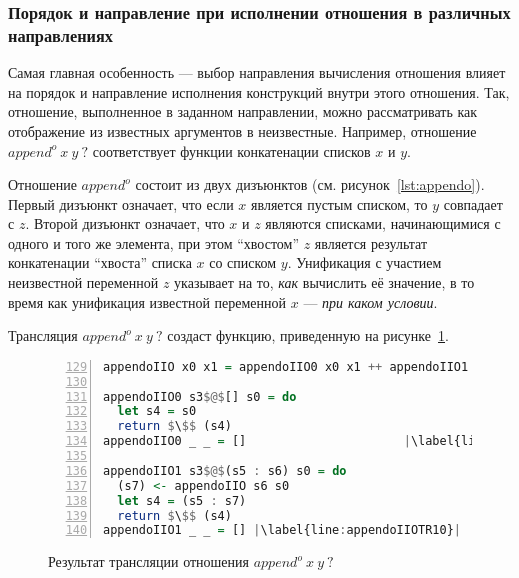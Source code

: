 
\subsubsection{Порядок и направление при исполнении отношения в различных направлениях}

Самая главная особенность --- выбор направления вычисления отношения влияет на порядок и направление исполнения конструкций внутри этого отношения.
Так, отношение, выполненное в заданном направлении, можно рассматривать как отображение из известных аргументов в неизвестные. 
Например, отношение $append^o \ x \ y \ ?$ соответствует функции конкатенации списков $x$ и $y$.

Отношение $append^o$ состоит из двух дизъюнктов (см. рисунок~\ref{lst:appendo}). 
Первый дизъюнкт означает, что если $x$ является пустым списком, то $y$ совпадает с $z$. 
Второй дизъюнкт означает, что $x$ и $z$ являются списками, начинающимися с одного и того же элемента, при этом ``хвостом'' $z$ является результат конкатенации ``хвоста'' списка $x$ со списком $y$. 
Унификация с участием неизвестной переменной $z$ указывает на то, \emph{как} вычислить её значение, в то время как унификация известной переменной $x$ --- \emph{при каком условии}.

Трансляция $append^o \ x \ y \ ?$ создаст функцию, приведенную на рисунке~\ref{lst:appendoIIOTR}.

\begin{figure}[h!]
  \begin{center}
  \begin{minipage}{0.75\textwidth}
  \begin{lstlisting}[language=Haskell, frame=single, numbers=left,numberstyle=\small, firstnumber=129, escapechar=|]
appendoIIO x0 x1 = appendoIIO0 x0 x1 ++ appendoIIO1 x0 x1

appendoIIO0 s3$@$[] s0 = do                                  |\label{line:appendoIIOTR2}|
  let s4 = s0
  return $\$$ (s4)
appendoIIO0 _ _ = []                      |\label{line:appendoIIOTR5}|

appendoIIO1 s3$@$(s5 : s6) s0 = do                           |\label{line:appendoIIOTR6}|
  (s7) <- appendoIIO s6 s0
  let s4 = (s5 : s7)
  return $\$$ (s4)
appendoIIO1 _ _ = [] |\label{line:appendoIIOTR10}|
  \end{lstlisting}
  \end{minipage}
  \end{center}
  \caption{Результат трансляции отношения $append^o \ x \ y \ ?$}
  \label{lst:appendoIIOTR}
\end{figure}

